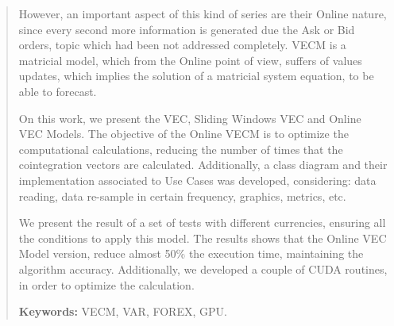 \begin{quotation}
However, an important aspect of this kind of series are their Online nature,
since every second more information is generated due the Ask or Bid orders,
topic which had been not addressed completely.  VECM is a matricial model,
which from the Online point of view, suffers of values updates, which implies
the solution of a matricial system equation, to be able to forecast.


On this work, we present the VEC, Sliding Windows VEC and Online VEC Models.
The objective of the Online VECM is to optimize the computational calculations,
reducing the number of times that the cointegration vectors are calculated.
Additionally, a class diagram and their implementation associated to Use Cases
was developed, considering: data reading, data re-sample in certain frequency,
graphics, metrics, etc.


We present the result of a set of tests with different currencies, ensuring all
the conditions to apply this model. The results shows that the Online VEC Model
version, reduce almost 50\% the execution time, maintaining the algorithm
accuracy. Additionally, we developed a couple of CUDA routines, in order to
optimize the calculation.


{\bf Keywords:} VECM, VAR, FOREX, GPU.
\end{quotation}

